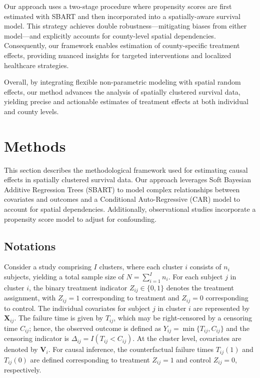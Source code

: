 \documentclass[useAMS,referee]{biom}
\begin{document}
Our approach uses a two-stage procedure where propensity scores are first estimated with SBART and then incorporated into a spatially-aware survival model. This strategy achieves double robustness—mitigating biases from either model—and explicitly accounts for county-level spatial dependencies. Consequently, our framework enables estimation of county-specific treatment effects, providing nuanced insights for targeted interventions and localized healthcare strategies.

Overall, by integrating flexible non-parametric modeling with spatial random effects, our method advances the analysis of spatially clustered survival data, yielding precise and actionable estimates of treatment effects at both individual and county levels.














\section{Methods}

This section describes the methodological framework used for estimating causal effects in spatially clustered survival data. Our approach leverages Soft Bayesian Additive Regression Trees (SBART) to model complex relationships between covariates and outcomes and a Conditional Auto-Regressive (CAR) model to account for spatial dependencies. Additionally, observational studies incorporate a propensity score model to adjust for confounding. 


\subsection{Notations}

Consider a study comprising \(I\) clusters, where each cluster \(i\) consists of \(n_i\) subjects, yielding a total sample size of \(N = \sum_{i=1}^{I} n_i\). For each subject \(j\) in cluster \(i\), the binary treatment indicator \(Z_{ij} \in \{0,1\}\) denotes the treatment assignment, with \(Z_{ij}=1\) corresponding to treatment and \(Z_{ij}=0\) corresponding to control. The individual covariates for subject \(j\) in cluster \(i\) are represented by \(\bm{X}_{ij}\). The failure time is given by \(T_{ij}\), which may be right-censored by a censoring time \(C_{ij}\); hence, the observed outcome is defined as \(Y_{ij} = \min\{T_{ij}, C_{ij}\}\) and the censoring indicator is \(\Delta_{ij} = I(T_{ij} < C_{ij})\). At the cluster level, covariates are denoted by \(\bm{V}_i\). For causal inference, the counterfactual failure times \(T_{ij}(1)\) and \(T_{ij}(0)\) are defined corresponding to treatment \(Z_{ij}=1\) and control \(Z_{ij}=0\), respectively.
\end{document}
